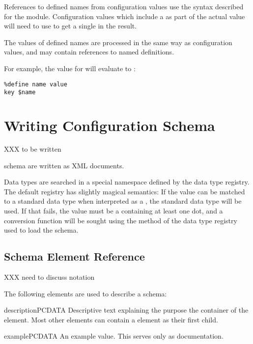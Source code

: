 \documentclass{howto}
\newcommand{\datatype}[1]{\strong{#1}}
\begin{document}
References to defined names from configuration values use the syntax
described for the  module.
Configuration values which include a \character{\$} as part of the
actual value will need to use \code{\$\$} to get a single
\character{\$} in the result.

The values of defined names are processed in the same way as
configuration values, and may contain references to named
definitions.

For example, the value for  will evaluate to :

\begin{verbatim}
%define name value
key $name
\end{verbatim} %


\section{Writing Configuration Schema \label{writing-schema}}

XXX to be written

 schema are written as XML documents.

Data types are searched in a special namespace defined by the data
type registry.  The default registry has slightly magical semantics:
If the value can be matched to a standard data type when interpreted
as a \datatype{basic-key}, the standard data type will be used.  If
that fails, the value must be a \datatype{dotted-name} containing at
least one dot, and a conversion function will be sought using the
 method of the data type registry used to load the
schema.


\subsection{Schema Element Reference \label{schema-ref}}

XXX need to discuss notation

The following elements are used to describe a schema:

\begin{elementdesc}{description}{PCDATA}
  Descriptive text explaining the purpose the container of the
   element.  Most other elements can contain
  a  element as their first child.
\end{elementdesc}

\begin{elementdesc}{example}{PCDATA}
  An example value.  This serves only as documentation.
\end{elementdesc}
\end{document}
